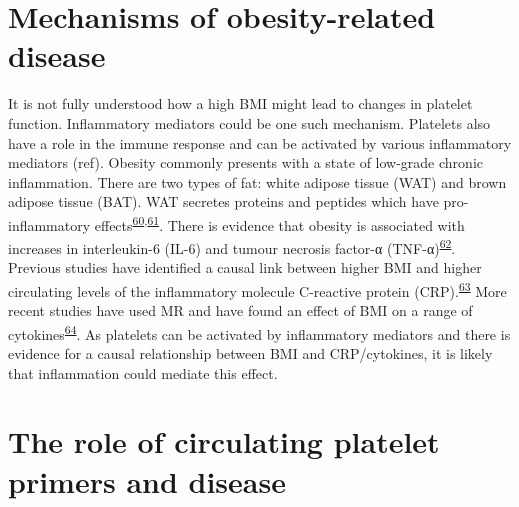 \documentclass[11pt,twoside]{bristolthesis}
\begin{document}
\hypertarget{mechanisms-of-obesity-related-disease}{%
\section{Mechanisms of obesity-related disease}\label{mechanisms-of-obesity-related-disease}}

It is not fully understood how a high BMI might lead to changes in platelet function. Inflammatory mediators could be one such mechanism. Platelets also have a role in the immune response and can be activated by various inflammatory mediators (ref). Obesity commonly presents with a state of low-grade chronic inflammation. There are two types of fat: white adipose tissue (WAT) and brown adipose tissue (BAT). WAT secretes proteins and peptides which have pro-inflammatory effects\textsuperscript{\protect\hyperlink{ref-Cercato2019}{60},\protect\hyperlink{ref-Kern2001}{61}}. There is evidence that obesity is associated with increases in interleukin-6 (IL-6) and tumour necrosis factor-α (TNF-α)\textsuperscript{\protect\hyperlink{ref-Esser2014}{62}}. Previous studies have identified a causal link between higher BMI and higher circulating levels of the inflammatory molecule C-reactive protein (CRP).\textsuperscript{\protect\hyperlink{ref-Timpson2011}{63}} More recent studies have used MR and have found an effect of BMI on a range of cytokines\textsuperscript{\protect\hyperlink{ref-Kalaoja2021}{64}}. As platelets can be activated by inflammatory mediators and there is evidence for a causal relationship between BMI and CRP/cytokines, it is likely that inflammation could mediate this effect.

\hypertarget{the-role-of-circulating-platelet-primers-and-disease}{%
\section{The role of circulating platelet primers and disease}\label{the-role-of-circulating-platelet-primers-and-disease}}
\end{document}

